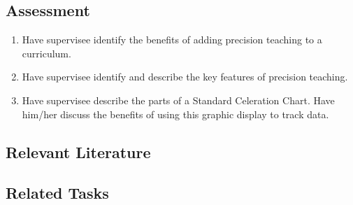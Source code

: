\subsection{Assessment}
\begin{enumerate}
\item Have supervisee identify the benefits of adding precision teaching to a curriculum.
\item Have supervisee identify and describe the key features of precision teaching. 
\item Have supervisee describe the parts of a Standard Celeration Chart. Have him/her discuss the benefits of using this graphic display to track data.
\end{enumerate}
%
\subsection{Relevant Literature}
\begin{refsection}
\nocite{cooper2007applied,
        cooper2000tutoring,
        kerr2003precision,
        hughes2007using,
        kubina2012precision,
        kubina2002benefits,
        potts1993ogden}
\printbibliography[heading=none]
\end{refsection}
%
\subsection{Related Tasks}
\fouraOne{}\\
\fouraSeven{}\\
\fourfThree{}\\
\fourhOne{}\\
\fourhTwo{}\\
\fourhThree{}\\
\fourhFour{}\\
\fourhFive{}\\
\fourjFifteen{}\\
\fourFKThirtyThree{}\\
